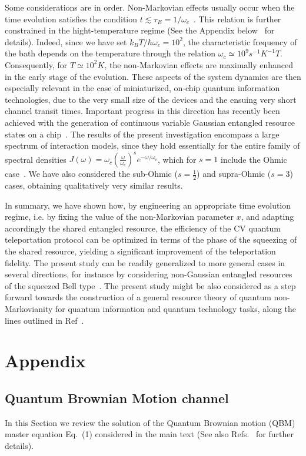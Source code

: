 \documentclass[prl,twocolumn,aps,floatfix,showpacs,tightenlines,superscriptaddress,amsmath,amssymb,amsfonts,10pt]{revtex4-1}
\begin{document}
Some considerations are in order. Non-Markovian effects usually occur when the time evolution satisfies the condition $t \lesssim \tau_E=1/\omega_c$~\cite{PhysRevA.70.032113}. This relation is further constrained in the hight-temperature regime (See the Appendix below~\cite{SuppMat} for details). Indeed, since we have set $k_B T/\hbar\omega_c=10^2$, the characteristic frequency of the bath depends on the temperature through the relation $\omega_c\simeq 10^9 s^{-1} K^{-1} T$. Consequently, for $T\simeq 10^2 K$, the non-Markovian effects are maximally enhanced in the early stage of the evolution. These aspects of the system dynamics are then especially relevant in the case of miniaturized, on-chip quantum information technologies, due to the very small size of the devices and the ensuing very short channel transit times. Important progress in this direction has recently been achieved with the generation of continuous variable Gaussian entangled resource states on a chip~\cite{Masada2015}.
The results of the present investigation encompass a large spectrum of interaction models, since they hold essentially for the entire family of spectral densities $J(\omega)=\omega_c(\frac{\omega}{\omega_c})^se^{-\omega/\omega_c}$, which for $s=1$ include the Ohmic case~\cite{PhysRevA.79.052120}. We have also considered the sub-Ohmic ($s=\frac{1}{2}$) and supra-Ohmic ($s=3$) cases, obtaining qualitatively very similar results.

In summary, we have shown how, by engineering an appropriate time evolution regime, i.e. by fixing the value of the non-Markovian parameter $x$, and adapting accordingly the shared entangled resource, the efficiency of the CV quantum teleportation protocol can be optimized in terms of the phase of the squeezing of the shared resource, yielding a significant improvement of the teleportation fidelity. The present study can be readily generalized to more general cases in several directions, for instance by considering non-Gaussian entangled resources of the squeezed Bell type~\cite{PhysRevA.81.012333}. The present study might be also considered as a step forward towards the construction of a general resource theory of quantum non-Markovianity for quantum information and quantum technology tasks, along the lines outlined in Ref~\cite{BrandaoPRL2015}.


\section{Appendix}

\subsection{Quantum Brownian Motion channel}
In this Section we review the solution of the Quantum Brownian motion (QBM) master equation Eq.~(1) considered in the main text (See also Refs.~\cite{PhysRevD.45.2843, PhysRevA.67.042108, PhysRevA.70.032113} for further details).
\end{document}
